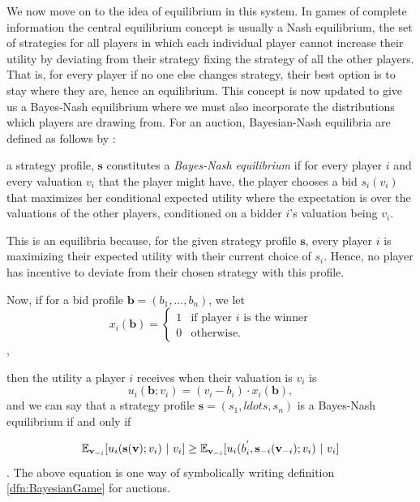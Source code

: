 \documentclass[12pt,twoside]{reedthesis}
\begin{document}
We now move on to the idea of equilibrium in this system. In games of complete information the central equilibrium concept is usually a Nash equilibrium, the set of strategies for all players in which each individual player cannot increase their utility by deviating from their strategy fixing the strategy of all the other players. That is, for every player if no one else changes strategy, their best option is to stay where they are, hence an equilibrium. This concept is now updated to give us a Bayes-Nash equilibrium where we must also incorporate the distributions which players are drawing from. For an auction, Bayesian-Nash equilibria are defined as follows by \cite{Roughgarden2017}:

\begin{dfn}
	a strategy profile, $\textbf{s}$ constitutes a {\em Bayes-Nash equilibrium} if for every player $i$ and every valuation $v_i$ that the player might have, the player chooses a bid $s_i(v_i)$ that maximizes her conditional expected utility where the expectation is over the valuations of the other players, conditioned on a bidder $i$'s valuation being $v_i$. 
\end{dfn}

This is an equilibria because, for the given strategy profile $\textbf{s}$, every player $i$ is maximizing their expected utility with their current choice of $s_i$. Hence, no player has incentive to deviate from their chosen strategy with this profile.
 
 Now, if for a bid profile $\textbf{b} = (b_1, \ldots, b_n)$, we let 
\[
	x_i(\textbf{b}) =
	\begin{cases}
		1 & \text{if player $i$ is the winner} \\
		0 & \text{otherwise}.
	\end{cases}
\],

then the utility a player $i$ receives when their valuation is $v_i$ is 
$$u_i(\textbf{b}; v_i) = (v_i - b_i) \cdot x_i(\textbf{b}),$$ and we can say that a strategy profile $\textbf{s} = (s_1, ldots, s_n)$ is a Bayes-Nash equilibrium if and only if


$$ \mathbb{E}_{\textbf{v}_{-i}} [u_i(\textbf{s} (\textbf{v}); v_i) \ | \ v_i] \geq \mathbb{E}_{\textbf{v}_{-i}} [u_i(b^{'}_i, \textbf{s}_{-i}(\textbf{v}_{-i}); v_i) \ | \ v_i] $$\citep{Roughgarden2017}. The above equation is one way of symbolically writing definition \ref{dfn:BayesianGame} for auctions.
\end{document}
